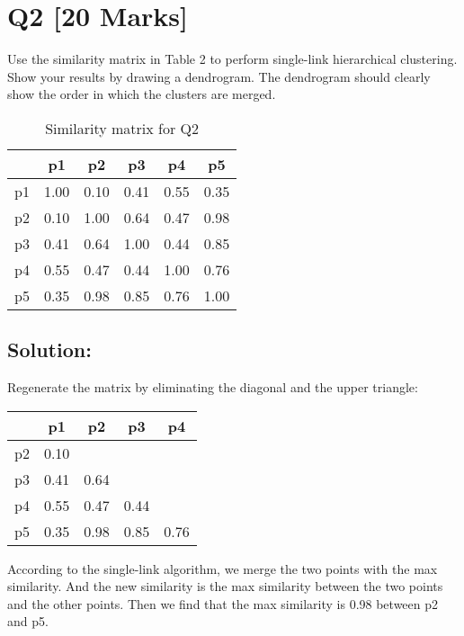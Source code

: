 \section*{Q2 [20 Marks]}

Use the similarity matrix in Table 2 to perform single-link hierarchical clustering. \\
Show your results by drawing a dendrogram. The dendrogram should clearly show the order in which the clusters are merged.
\begin{table}[h]
    \centering
    \begin{tabular}{@{}|c|c|c|c|c|c|@{}}
        \hline
        & p1   & p2   & p3   & p4   & p5   \\
        \hline
        p1 & 1.00 & 0.10 & 0.41 & 0.55 & 0.35 \\
        \hline
        p2 & 0.10 & 1.00 & 0.64 & 0.47 & 0.98 \\
        \hline
        p3 & 0.41 & 0.64 & 1.00 & 0.44 & 0.85 \\
        \hline
        p4 & 0.55 & 0.47 & 0.44 & 1.00 & 0.76 \\
        \hline
        p5 & 0.35 & 0.98 & 0.85 & 0.76 & 1.00 \\
        \hline
    \end{tabular}
    \caption{Similarity matrix for Q2}
\end{table}

\subsection*{Solution:}

Regenerate the matrix by eliminating the diagonal and the upper triangle:

\begin{table}[h]
    \centering
    \begin{tabular}{@{}c|cccc@{}}
        \hline
        & p1 & p2 & p3 & p4 \\
        \hline

        p2 & 0.10 &      &      &     \\
        p3 & 0.41 & 0.64 &      &     \\
        p4 & 0.55 & 0.47 & 0.44 &     \\
        p5 & 0.35 & 0.98 & 0.85 & 0.76 \\
    \end{tabular}
\end{table}

According to the single-link algorithm, we merge the two points with the max similarity.
And the new similarity is the max similarity between the two points and the other points.
Then we find that the max similarity is 0.98 between p2 and p5.

